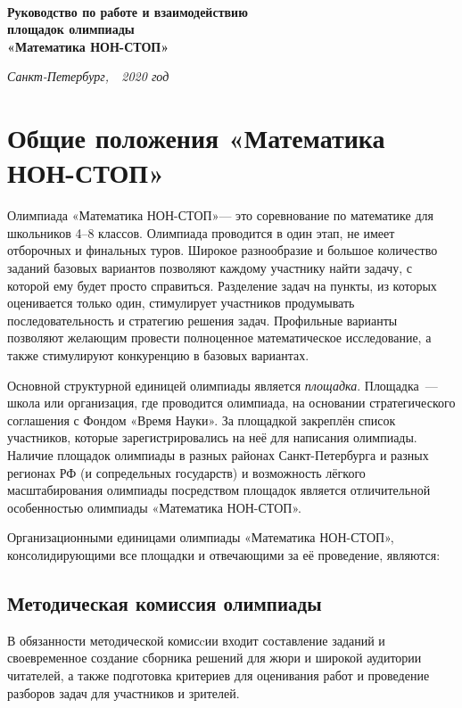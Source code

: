 \documentclass[a4paper,12pt]{article}
\newcommand{\mns}{«Математика НОН-СТОП»\xspace}
\begin{document}
\begin{center} {\LARGE\bf \ \\
	Руководство по работе и взаимодействию \\
	площадок олимпиады \\
	\mns \\}
\end{center}

\begin{flushright} {\it
	Санкт-Петербург,\ \ 2020 год}
\end{flushright}

\section{Общие положения \mns}

Олимпиада \mns — это соревнование по математике для школьников 4–8 классов. Олимпиада проводится в один этап, не имеет отборочных и финальных туров. Широкое разнообразие и большое количество заданий базовых вариантов позволяют каждому участнику найти задачу, с которой ему будет просто справиться. Разделение задач на пункты, из которых оценивается только один, стимулирует участников продумывать последовательность и стратегию решения задач. Профильные варианты позволяют желающим провести полноценное математическое исследование, а также стимулируют конкуренцию в базовых вариантах.

Основной структурной единицей олимпиады является {\itshape площадка}. Площадка~— школа или организация, где проводится олимпиада, на основании стратегического соглашения с Фондом «Время Науки». За площадкой закреплён список участников, которые зарегистрировались на неё для написания олимпиады. Наличие площадок олимпиады в разных районах Санкт-Петербурга и разных регионах РФ (и сопредельных государств) и возможность лёгкого масштабирования олимпиады посредством площадок является отличительной особенностью олимпиады \mns.

Организационными единицами олимпиады \mns, консолидирующими все площадки и отвечающими за её проведение, являются:

\subsection{Методическая комиссия олимпиады}

В обязанности методической комисcии входит составление заданий и своевременное создание сборника решений для жюри и широкой аудитории читателей, а также подготовка критериев для оценивания работ и проведение разборов задач для участников и зрителей.
\end{document}
